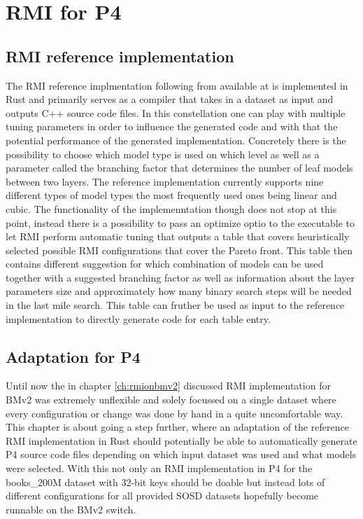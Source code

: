 
\chapter{RMI for P4}
\label{ch:rmiforp4}

\section{RMI reference implementation}
The RMI reference implmentation following from \cite{cdfshop} available at \cite{rmi-reference} is implemented in Rust and primarily serves as a compiler that takes in a dataset as input and outputs C++ source code files. In this constellation one can play with multiple tuning parameters in order to influence the generated code and with that the potential performance of the generated implementation. Concretely there is the possibility to choose which model type is used on which level as well as a parameter called the branching factor that determines the number of leaf models between two layers. The reference implementation currently supports nine different types of model types the most frequently used ones being linear and cubic. The functionality of the implemenntation though does not stop at this point, instead there is a possibility to pass an optimize optio to the executable to let RMI perform automatic tuning that outputs a table that covers heuristically selected possible RMI configurations that cover the Pareto front. This table then contains different suggestion for which combination of models can be used together with a suggested branching factor as well as information about the layer parameters size and approximately how many binary search steps will be needed in the last mile search. This table can fruther be used as input to the reference implementation to directly generate code for each table entry.

\section{Adaptation for P4}
Until now the in chapter \ref{ch:rmionbmv2} discussed RMI implementation for BMv2 was extremely unflexible and solely focussed on a single dataset where every configuration or change was done by hand in a quite uncomfortable way. This chapter is about going a step further, where an adaptation of the reference RMI implementation in Rust should potentially be able to automatically generate P4 source code files depending on which input dataset was used and what models were selected. With this not only an RMI implementation in P4 for the books\_200M dataset with 32-bit keys should be doable but instead lots of different configurations for all provided SOSD datasets hopefully become runnable on the BMv2 switch.\\

